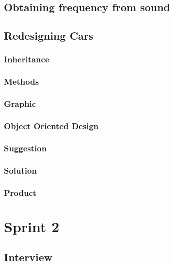 \section{Obtaining frequency from sound}


\section{Redesigning Cars}

\subsection{Inheritance}

\subsection{Methods}

\subsection{Graphic}

\subsection{Object Oriented Design}

\subsection{Suggestion}



\subsection{Solution}


\subsection{Product}


\chapter{Sprint 2}


\newpage

\section{Interview}


